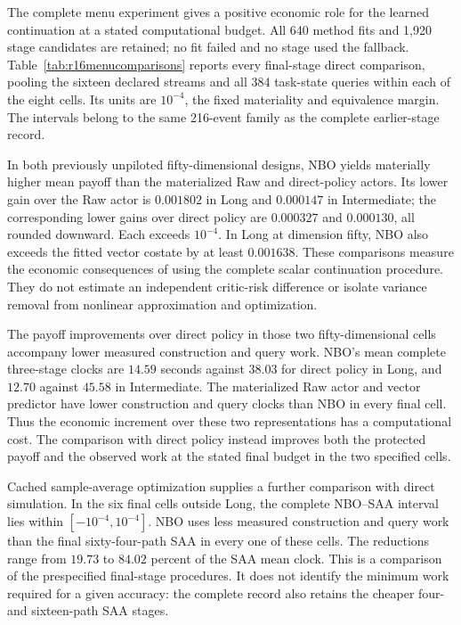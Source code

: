 The complete menu experiment gives a positive economic role for the learned
continuation at a stated computational budget. All 640 method fits and
1,920 stage candidates are retained; no fit failed and no stage used the
fallback. Table~\ref{tab:r16menucomparisons} reports every final-stage direct
comparison, pooling the sixteen declared streams and all 384 task-state
queries within each of the eight cells. Its units are $10^{-4}$, the fixed
materiality and equivalence margin. The intervals belong to the same
216-event family as the complete earlier-stage record.



In both previously unpiloted fifty-dimensional designs, NBO yields materially
higher mean payoff than the materialized Raw and direct-policy actors. Its
lower gain over the Raw actor is $0.001802$ in Long and $0.000147$ in Intermediate;
the corresponding lower gains over direct policy are $0.000327$ and
$0.000130$, all rounded downward. Each exceeds $10^{-4}$. In Long at
dimension fifty, NBO also exceeds the fitted vector costate by at least
$0.001638$. These comparisons measure the economic consequences of using the
complete scalar continuation procedure. They do not estimate an independent
critic-risk difference or isolate variance removal from nonlinear
approximation and optimization.



The payoff improvements over direct policy in those two fifty-dimensional
cells accompany lower measured construction and query work. NBO's mean
complete three-stage clocks are $14.59$ seconds against $38.03$ for direct
policy in Long, and $12.70$ against $45.58$ in Intermediate. The materialized
Raw actor and vector predictor have lower construction and query clocks
than NBO in every final cell. Thus the economic increment over these two
representations has a computational cost. The comparison with direct policy
instead improves both the protected payoff and the observed work at the
stated final budget in the two specified cells.

Cached sample-average optimization supplies a further comparison with direct
simulation. In the six final cells outside Long, the complete NBO--SAA
interval lies within $[-10^{-4},10^{-4}]$. NBO uses less measured construction
and query work than the final sixty-four-path SAA in every one of these
cells. The reductions range from $19.73$ to $84.02$ percent of the SAA mean
clock. This is a comparison of the prespecified final-stage procedures. It
does not identify the minimum work required for a given accuracy: the
complete record also retains the cheaper four- and sixteen-path SAA stages.

